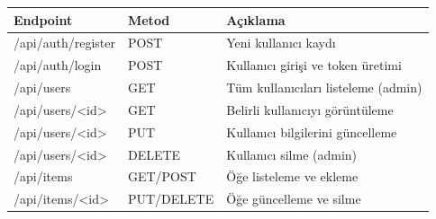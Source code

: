 \begin{table}[H]
\centering
\begin{tabular}{|L{3.5cm}|L{3.5cm}|L{3.5cm}|}
\hline
\textbf{Endpoint} & \textbf{Metod} & \textbf{Açıklama} \\
\hline
/api/auth/register & POST & Yeni kullanıcı kaydı \\
\hline
/api/auth/login & POST & Kullanıcı girişi ve token üretimi \\
\hline
/api/users & GET & Tüm kullanıcıları listeleme (admin) \\
\hline
/api/users/<id> & GET & Belirli kullanıcıyı görüntüleme \\
\hline
/api/users/<id> & PUT & Kullanıcı bilgilerini güncelleme \\
\hline
/api/users/<id> & DELETE & Kullanıcı silme (admin) \\
\hline
/api/items & GET/POST & Öğe listeleme ve ekleme \\
\hline
/api/items/<id> & PUT/DELETE & Öğe güncelleme ve silme \\
\hline
\end{tabular}
\end{table}


\clearpage
